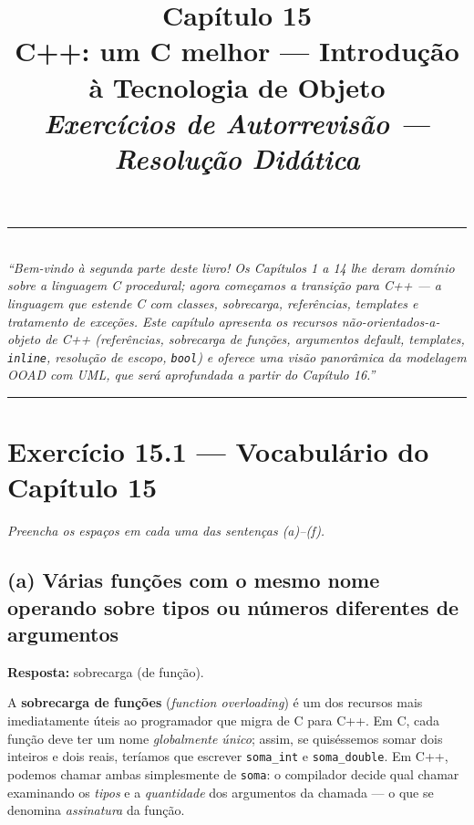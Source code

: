 \documentclass[11pt,a4paper]{article}
\title{
  \vspace{-1cm}
  {\Huge\bfseries\color{deitelblue} Cap\'itulo 15}\\[0.3em]
  {\Large\bfseries C++: um C melhor --- Introdu\c{c}\~ao \`a Tecnologia de Objeto}\\[0.8em]
  {\large\itshape Exerc\'icios de Autorrevis\~ao --- Resolu\c{c}\~ao Did\'atica}
}
\author{}
\date{}
\begin{document}
\maketitle
\thispagestyle{empty}
\vspace{-2em}

\begin{center}
\rule{0.85\textwidth}{0.5pt}\\[0.4em]
\textit{``Bem-vindo \`a segunda parte deste livro! Os Cap\'itulos 1 a 14 lhe deram dom\'inio sobre a linguagem C procedural; agora come\c{c}amos a transi\c{c}\~ao para C++ --- a linguagem que estende C com classes, sobrecarga, refer\^encias, templates e tratamento de exce\c{c}\~oes. Este cap\'itulo apresenta os recursos n\~ao-orientados-a-objeto de C++ (refer\^encias, sobrecarga de fun\c{c}\~oes, argumentos default, templates, \texttt{inline}, resolu\c{c}\~ao de escopo, \texttt{bool}) e oferece uma vis\~ao panor\^amica da modelagem OOAD com UML, que ser\'a aprofundada a partir do Cap\'itulo 16.''}\\[0.4em]
\rule{0.85\textwidth}{0.5pt}
\end{center}

\vspace{1em}

\section{Exerc\'icio 15.1 --- Vocabul\'ario do Cap\'itulo 15}

\textit{Preencha os espa\c{c}os em cada uma das senten\c{c}as (a)--(f).}

\subsection*{(a) V\'arias fun\c{c}\~oes com o mesmo nome operando sobre tipos ou n\'umeros diferentes de argumentos}

\begin{resposta}\textbf{Resposta:} sobrecarga (de fun\c{c}\~ao).\end{resposta}

A \textbf{sobrecarga de fun\c{c}\~oes} (\emph{function overloading}) \'e um dos recursos mais imediatamente \'uteis ao programador que migra de C para C++. Em C, cada fun\c{c}\~ao deve ter um nome \emph{globalmente \'unico}; assim, se quis\'essemos somar dois inteiros e dois reais, ter\'iamos que escrever \texttt{soma\_int} e \texttt{soma\_double}. Em C++, podemos chamar ambas simplesmente de \texttt{soma}: o compilador decide qual chamar examinando os \emph{tipos} e a \emph{quantidade} dos argumentos da chamada --- o que se denomina \emph{assinatura} da fun\c{c}\~ao.
\end{document}
